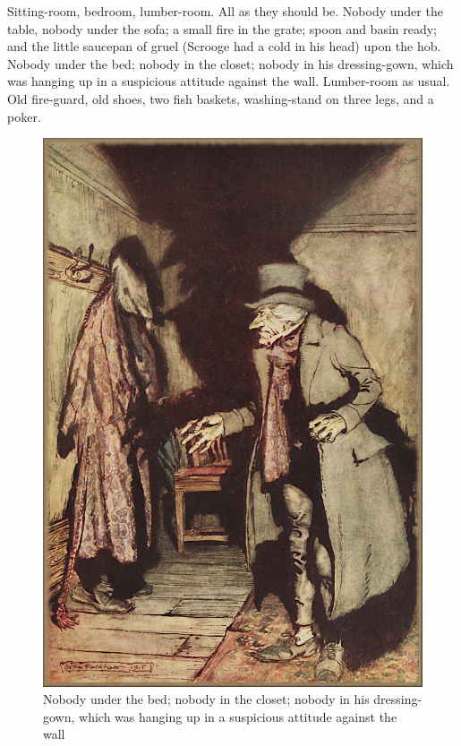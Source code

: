 \documentclass[paper=5.5in:8.5in,BCOR=7mm,twoside,DIV=calc,12pt,usegeometry]{scrbook} %
\begin{document}
Sitting-room, bedroom, lumber-room. All as they should be. Nobody under the table, nobody under the sofa; a small fire in the grate; spoon and basin ready; and the little saucepan of gruel (Scrooge had a cold in his head) upon the hob. Nobody under the bed; nobody in the closet; nobody in his dressing-gown, which was hanging up in a suspicious attitude against the wall. Lumber-room as usual. Old fire-guard, old shoes, two fish baskets, washing-stand on three legs, and a poker.

\begin{figure}[p]
\begin{minipage}[c]{\linewidth}
\includegraphics[width=\linewidth]{dressinggown}
\caption[Nobody in his dressing-gown]{Nobody under the bed; nobody in the closet; nobody in his dressing-gown, which was hanging up in a suspicious attitude against the wall}
\end{minipage}
\end{figure}
 
\end{document}
